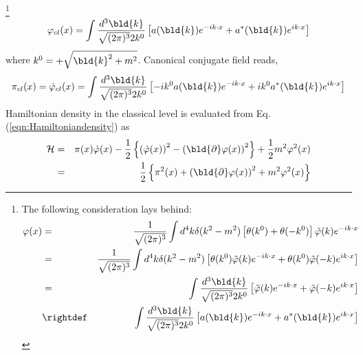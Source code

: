 \footnote{%
The following consideration lays behind:
\begin{eqnarray*}
\varphi(x)
&=&
\frac{1}{\sqrt{(2\pi)^3}}
\int 
d^4 k
\delta(k^2 - m^2)
\left[
\theta(k^0) + \theta(-k^0)
\right]
\tilde{\varphi} (k)
e^{-i k \cdot x}
\nonumber\\
&=&
\frac{1}{\sqrt{(2\pi)^3}}
\int 
d^4 k
\delta(k^2 - m^2)
\left[
\theta(k^0)
\tilde{\varphi} (k)
e^{-i k \cdot x}
 + \theta(k^0)
\tilde{\varphi} (-k)
e^{i k \cdot x}
\right]
\nonumber\\
&=&
\int 
\frac{d^3 \bld{k}}{\sqrt{(2\pi)^3}2 k^0}
\left[
\tilde{\varphi} (k)
e^{-i k \cdot x}
 + 
\tilde{\varphi} (-k)
e^{i k \cdot x}
\right]
\nonumber\\
&\rightdef&
\int 
\frac{d^3 \bld{k}}{\sqrt{(2\pi)^3}2 k^0}
\left[
a (\bld{k})
e^{-i k \cdot x}
 +
 a^*(\bld{k}) 
e^{i k \cdot x}
\right]
\end{eqnarray*}
}%
\begin{equation}
\varphi_{cl}(x) = \int \frac{d^3 \bld{k}}{\sqrt{(2\pi)^3}2k^0} \left[
a(\bld{k}) e^{-i k \cdot x} + a^*(\bld{k})e^{i k \cdot x} \right]
\label{eqn:KGclassicalsol}
\end{equation}
where $k^0 = + \sqrt{\bld{k}^2 + m^2}$. 
Canonical conjugate field reads,
\begin{equation}
\pi_{cl}(x) = \dot{\varphi}_{cl}(x)
=
\int \frac{d^3 \bld{k}}{\sqrt{(2\pi)^3}2k^0}  \left[
- i k^0 a(\bld{k}) e^{-i k \cdot x} + i k^0 a^*(\bld{k})e^{i k \cdot x} \right]
\label{eqn:KGclassicalpi}
\end{equation}
Hamiltonian density in the classical level is evaluated from Eq. (\ref{eqn:Hamiltoniandensity}) as
\begin{eqnarray}
{\cal H} &=& \pi(x) \dot{\varphi}(x) - \frac{1}{2} \left\{
\left( \dot{\varphi}(x) \right)^2 - 
\left( \bld{\partial} \varphi(x) \right)^2 \right\}
+ \frac{1}{2} m^2 \varphi^2(x)
\nonumber\\
&=&
\frac{1}{2} \left\{
\pi^2 (x) + \left( \bld{\partial} \varphi(x) \right)^2 + m^2 \varphi^2(x)
\right\}
\label{eqn:KGHamiltoniandens}
\end{eqnarray}
